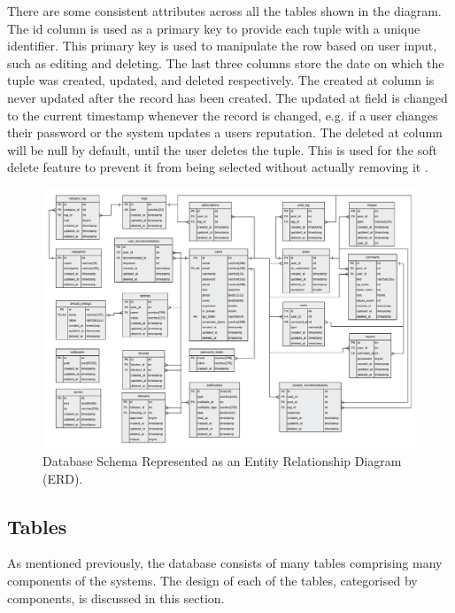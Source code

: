 There are some consistent attributes across all the tables shown in the diagram. The id column is used as a primary key to provide each tuple with a unique identifier. This primary key is used to manipulate the row based on user input, such as editing and deleting. The last three columns store the date on which the tuple was created, updated, and deleted respectively. The created at column is never updated after the record has been created. The updated at field is changed to the current timestamp whenever the record is changed, e.g. if a user changes their password or the system updates a users reputation. The deleted at column will be null by default, until the user deletes the tuple. This is used for the soft delete feature to prevent it from being selected without actually removing it \cite{PCMEncyclopedia:SoftDelete}.

\begin{figure}[H]
  \centering
  \includegraphics[width=1.0\textwidth]{Images/Design/Database/ERD}
  \caption{Database Schema Represented as an Entity Relationship Diagram (ERD).} \label{fig:Database_ERD}
\end{figure}

\subsection{Tables}
\label{SubSection:Database_Tables}
As mentioned previously, the database consists of many tables comprising many components of the systems. The design of each of the tables, categorised by components, is discussed in this section.

